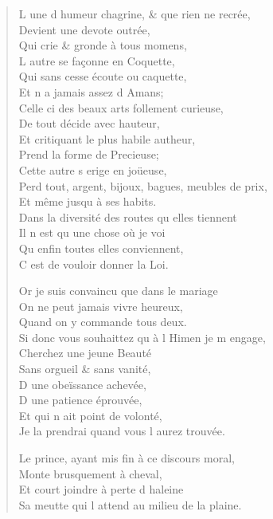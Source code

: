 \begin{verse}
L\textquotesingle{} une d\textquotesingle{} humeur chagrine, \& que rien ne recrée, \\
\vin Devient une devote outrée, \\
\vin Qui crie \& gronde à tous momens, \\
\vin L\textquotesingle{} autre se façonne en Coquette, \\
\vin Qui sans cesse écoute ou caquette, \\
\vin Et n\textquotesingle{} a jamais assez d\textquotesingle{} Amans; \\
Celle ci des beaux arts follement curieuse, \\
\vin De tout décide avec hauteur, \\
\vin Et critiquant le plus habile autheur, \\
\vin Prend la forme de Precieuse; \\
\vin Cette autre s\textquotesingle{} erige en joüeuse, \\
Perd tout, argent, bijoux, bagues, meubles de prix, \\
\vin Et même jusqu\textquotesingle{} à ses habits. \\
Dans la diversité des routes qu\textquotesingle{} elles tiennent \\
\vin Il n\textquotesingle{} est qu\textquotesingle{} une chose où je voi \\
\vin Qu\textquotesingle{} enfin toutes elles conviennent, \\
\vin C\textquotesingle{} est de vouloir donner la Loi.

Or je suis convaincu que dans le mariage \\
\vin On ne peut jamais vivre heureux, \\
\vin Quand on y commande tous deux. \\
Si donc vous souhaittez qu\textquotesingle{} à l\textquotesingle{} Himen je m\textquotesingle{} engage, \\
\vin Cherchez une jeune Beauté \\
\vin Sans orgueil \& sans vanité, \\
\vin D\textquotesingle{} une obeïssance achevée, \\
\vin D\textquotesingle{} une patience éprouvée, \\
\vin Et qui n\textquotesingle{} ait point de volonté, \\
\vin Je la prendrai quand vous l\textquotesingle{} aurez trouvée.

Le prince, ayant mis fin à ce discours moral, \\
\vin Monte brusquement à cheval, \\
\vin Et court joindre à perte d\textquotesingle{} haleine \\
Sa meutte qui l\textquotesingle{} attend au milieu de la plaine.


\end{verse}
